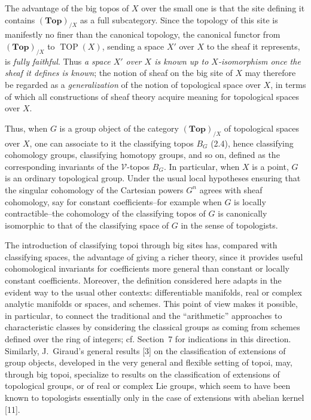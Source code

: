 \documentclass[11pt]{article}
\newcommand{\V}{\mathcal{V}}
\newcommand{\Esp}{\mathbf{Top}}
\newcommand{\TOP}{\operatorname{TOP}}
\begin{document}
The advantage of the big topos of \(X\) over the small one is that the site defining it contains \((\Esp)_{/X}\) as a full subcategory. Since the topology of this site is manifestly no finer than the canonical topology, the canonical functor from \((\Esp)_{/X}\) to \(\TOP(X)\), sending a space \(X'\) over \(X\) to the sheaf it represents, is \emph{fully faithful}. Thus \emph{a space \(X'\) over \(X\) is known up to \(X\)-isomorphism once the sheaf it defines is known}; the notion of sheaf on the big site of \(X\) may therefore be regarded as a \emph{generalization} of the notion of topological space over \(X\), in terms of which all constructions of sheaf theory acquire meaning for topological spaces over \(X\).

Thus, when \(G\) is a group object of the category \((\Esp)_{/X}\) of topological spaces over \(X\), one can associate to it the classifying topos \(B_G\) (2.4), hence classifying cohomology groups, classifying homotopy groups, and so on, defined as the corresponding invariants of the \(\V\)-topos \(B_G\). In particular, when \(X\) is a point, \(G\) is an ordinary topological group. Under the usual local hypotheses ensuring that the singular cohomology of the Cartesian powers \(G^n\) agrees with sheaf cohomology, say for constant coefficients--for example when \(G\) is locally contractible--the cohomology of the classifying topos of \(G\) is canonically isomorphic to that of the classifying space of \(G\) in the sense of topologists.

The introduction of classifying topoi through big sites has, compared with classifying spaces, the advantage of giving a richer theory, since it provides useful cohomological invariants for coefficients more general than constant or locally constant coefficients. Moreover, the definition considered here adapts in the evident way to the usual other contexts: differentiable manifolds, real or complex analytic manifolds or spaces, and schemes. This point of view makes it possible, in particular, to connect the traditional and the ``arithmetic'' approaches to characteristic classes by considering the classical groups as coming from schemes defined over the ring of integers; cf. Section~7 for indications in this direction. Similarly, J.~Giraud's general results [3] on the classification of extensions of group objects, developed in the very general and flexible setting of topoi, may, through big topoi, specialize to results on the classification of extensions of topological groups, or of real or complex Lie groups, which seem to have been known to topologists essentially only in the case of extensions with abelian kernel [11].
\end{document}
